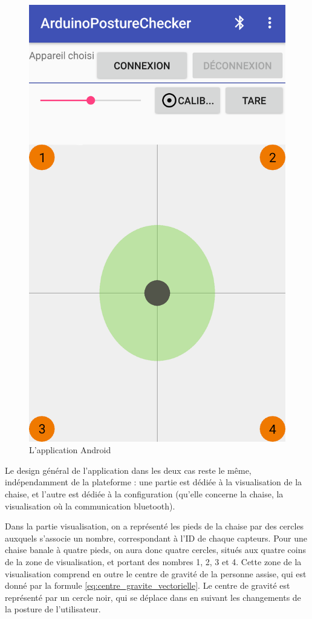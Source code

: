 \documentclass{polytech/polytech}
\begin{document}
\begin{figure}[htbp]
\begin{center}
\includegraphics[width=12cm]{image/screenshot_android1}
\end{center}
\caption{L'application Android}
\label{fig:screenshot_android}
\end{figure}

Le design général de l'application dans les deux cas reste le même, indépendamment de la plateforme :  une partie est dédiée à la visualisation de la chaise, et l'autre est dédiée à la configuration (qu'elle concerne la chaise, la visualisation où la communication bluetooth). 

Dans la partie visualisation, on a représenté les pieds de la chaise par des cercles auxquels s'associe un nombre, correspondant à l'ID de chaque capteurs. Pour une chaise banale à quatre pieds, on aura donc quatre cercles, situés aux quatre coins de la zone de visualisation, et portant des nombres 1, 2, 3 et 4.
Cette zone de la visualisation comprend en outre le centre de gravité de la personne assise, qui est donné par la formule \eqref{eq:centre_gravite_vectorielle}. Le centre de gravité est représenté par un cercle noir, qui se déplace dans en suivant les changements de la posture de l'utilisateur.
\end{document}
